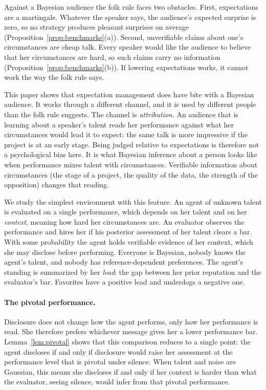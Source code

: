 \documentclass[11pt]{article}
\theoremstyle{definition}
\begin{document}
Against a Bayesian audience the folk rule faces two obstacles. First, expectations are a martingale. Whatever the speaker says, the audience's expected surprise is zero, so no strategy produces pleasant surprises on average (Proposition~\ref{prop:benchmarks}(a)). Second, unverifiable claims about one's circumstances are cheap talk. Every speaker would like the audience to believe that her circumstances are hard, so such claims carry no information (Proposition~\ref{prop:benchmarks}(b)). If lowering expectations works, it cannot work the way the folk rule says.

This paper shows that expectation management does have bite with a Bayesian audience. It works through a different channel, and it is used by different people than the folk rule suggests. The channel is \emph{attribution}. An audience that is learning about a speaker's talent reads her performance against what her circumstances would lead it to expect: the same talk is more impressive if the project is at an early stage. Being judged relative to expectations is therefore not a psychological bias here. It is what Bayesian inference about a person looks like when performance mixes talent with circumstances. Verifiable information about circumstances (the stage of a project, the quality of the data, the strength of the opposition) changes that reading.

We study the simplest environment with this feature. An agent of unknown talent is evaluated on a single performance, which depends on her talent and on her \emph{context}, meaning how hard her circumstances are. An evaluator observes the performance and hires her if his posterior assessment of her talent clears a bar. With some probability the agent holds verifiable evidence of her context, which she may disclose before performing. Everyone is Bayesian, nobody knows the agent's talent, and nobody has reference-dependent preferences. The agent's standing is summarized by her \emph{lead}: the gap between her prior reputation and the evaluator's bar. Favorites have a positive lead and underdogs a negative one.

\paragraph{The pivotal performance.} Disclosure does not change how the agent performs, only how her performance is read. She therefore prefers whichever message gives her a lower performance bar. Lemma~\ref{lem:pivotal} shows that this comparison reduces to a single point: the agent discloses if and only if disclosure would raise her assessment at the performance level that is pivotal under silence. When talent and noise are Gaussian, this means she discloses if and only if her context is harder than what the evaluator, seeing silence, would infer from that pivotal performance.
\end{document}
